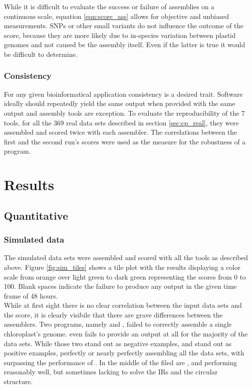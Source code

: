 While it is difficult to evaluate the success or failure of assemblies on a continuous
scale, equation \ref{eqn:score_ass} allows for objective and unbiased measurements. SNPs
or other small variants do not influence the outcome of the score, because they are more
likely due to in-species variation between plastid genomes and not caused be the assembly
itself. Even if the latter is true it would be difficult to determine.
  
\subsubsection{Consistency}
For any given bioinformatical application consistency is a desired trait. Software ideally
should repeatedly yield the same output when provided with the same output and assembly
tools are exception. To evaluate the reproducibility of the 7 tools, for all the 369 real
data sets described in section \ref{sec:cp_real}, they were assembled and scored twice
with each assembler. The correlations between the first and the second run's scores were
used as the measure for the robustness of a program.

\section{Results} \label{results:ca}
\subsection{Quantitative}
\subsubsection{Simulated data}
\label{results:sim}

The simulated data sets were assembled and scored with all the tools as described
above. Figure \ref{fig:sim_tiles} shows a tile plot with the results displaying a color
scale from orange over light
green to dark green representing the scores from 0 to 100. Blank spaces indicate the failure to produce any output in the given time frame of 48 hours. \\
While at first sight there is no clear correlation between the input data sets and the
score, it is clearly visibile that there are grave differences between the assemblers. Two
programs, namely \cassp \hspace{0.5ex} and \ioga, failed to correctly assemble a single
chloroplast's genome. \ioga \hspace{0.5ex} even fails to provide an output at all for the
majority of the data sets. While those two stand out as negative examples, \fp
\hspace{0.5ex} and \go \hspace{0.5ex} stand out as positive examples, perfectly or nearly
perfectly assembling all the data sets, with \go \hspace{0.5ex} surpassing the performance
of \fp. In the middle of the filed are \ce, \oa \hspace{0.5ex} and \np \hspace{0.5ex}
performing reasonably well, but sometimes lacking to solve the IRs and the circular
structure.

